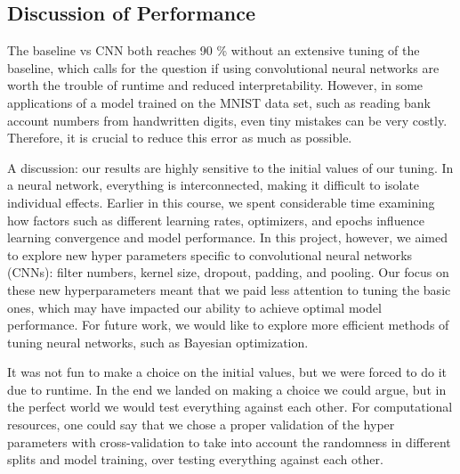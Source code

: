 \subsection{Discussion of Performance}
The baseline vs CNN both reaches 90 \% without an extensive tuning of the baseline, which calls for the question if using convolutional neural networks are worth the trouble of runtime and reduced interpretability. However, in some applications of a model trained on the MNIST data set, such
as reading bank account numbers from handwritten digits, even tiny mistakes can be very costly.
Therefore, it is crucial to reduce this error as much as possible. \cite{raschka2022machine}


A discussion: our results are highly sensitive to the initial values of our tuning. In a neural network, everything is interconnected, making it difficult to isolate individual effects. Earlier in this course, we spent considerable time examining how factors such as different learning rates, optimizers, and epochs influence learning convergence and model performance. In this project, however, we aimed to explore new hyper parameters specific to convolutional neural networks (CNNs): filter numbers, kernel size, dropout, padding, and pooling. Our focus on these new hyperparameters meant that we paid less attention to tuning the basic ones, which may have impacted our ability to achieve optimal model performance. For future work, we would like to explore more efficient methods of tuning neural networks, such as Bayesian optimization.

It was not fun to make a choice on the initial values, but we were forced to do it due to runtime. In the end we landed on making a choice we could argue, but in the perfect world we would test everything against each other. For computational resources, one could say that we chose a proper validation of the hyper parameters with cross-validation to take into account the randomness in different splits and model training, over testing everything against each other. 